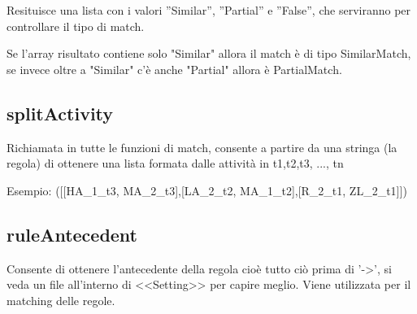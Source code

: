 \documentclass[a4paper]{article}
\begin{document}
Resituisce una lista con i valori ''Similar'', ''Partial'' e ''False'', che serviranno per controllare il tipo di match.

Se l'array risultato contiene solo "Similar" allora il match è di tipo SimilarMatch, se invece oltre a "Similar" c'è anche "Partial" allora è PartialMatch.

\subsection{splitActivity}
Richiamata in tutte le funzioni di match, consente a partire da una stringa (la regola) di ottenere una lista formata dalle attività in t1,t2,t3, ..., tn 

Esempio: ([[HA\_1\_t3, MA\_2\_t3],[LA\_2\_t2, MA\_1\_t2],[R\_2\_t1, ZL\_2\_t1]])

\subsection{ruleAntecedent}
Consente di ottenere l'antecedente della regola cioè tutto ciò prima di '->', si veda un file all'interno di <<Setting>> per capire meglio.
Viene utilizzata per il matching delle regole.
\end{document}
